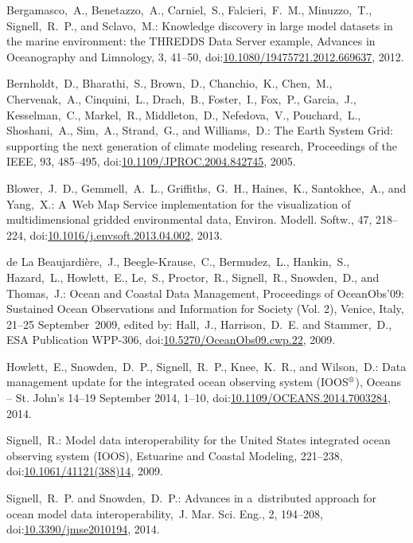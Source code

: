 \documentclass[osd, online, hvmath]{copernicus}
\begin{document}
\begin{thebibliography}{99}

Bergamasco,~A., Benetazzo,~A., Carniel,~S., Falcieri,~F.~M., Minuzzo,~T., Signell,~R.~P., and Sclavo,~M.:
 Knowledge discovery in large model datasets in the marine environment: the THREDDS Data Server example, Advances in Oceanography and Limnology, 3, 41--50,
doi:\href{http://dx.doi.org/10.1080/19475721.2012.669637}{10.1080/19475721.2012.669637}, 2012.


Bernholdt,~D., Bharathi,~S., Brown,~D., Chanchio,~K., Chen,~M.,
Chervenak,~A., Cinquini,~L., Drach,~B., Foster,~I., Fox,~P.,
Garcia,~J., Kesselman,~C., Markel,~R., Middleton,~D., Nefedova,~V.,
Pouchard,~L., Shoshani,~A., Sim,~A., Strand,~G., and Williams,~D.: The Earth System Grid: supporting the next generation of climate modeling research, Proceedings of the IEEE, 93, 485--495,
doi:\href{http://dx.doi.org/10.1109/JPROC.2004.842745}{10.1109/JPROC.2004.842745}, 2005.


Blower,~J.~D., Gemmell,~A.~L., Griffiths,~G.~H., Haines,~K.,
Santokhee,~A., and Yang,~X.: A~Web Map Service implementation for the visualization of multidimensional gridded environmental data, Environ. Modell. Softw., 47, 218--224,
doi:\href{http://dx.doi.org/10.1016/j.envsoft.2013.04.002}{10.1016/j.envsoft.2013.04.002}, 2013.


de La Beaujardi\`{e}re,~J., Beegle-Krause,~C., Bermudez,~L.,
Hankin,~S., Hazard,~L., Howlett,~E., Le,~S., Proctor,~R., Signell,~R.,
Snowden,~D., and Thomas,~J.: Ocean and Coastal Data Management,
Proceedings of OceanObs'09: Sustained Ocean Observations and
Information for Society (Vol. 2), Venice, Italy, 21--25
September~2009, edited by: Hall,~J., Harrison,~D.~E. and Stammer,~D., ESA Publication
WPP-306,
doi:\href{http://dx.doi.org/10.5270/OceanObs09.cwp.22}{10.5270/OceanObs09.cwp.22}, 2009.


Howlett,~E., Snowden,~D.~P., Signell,~R.~P., Knee,~K.~R., and
Wilson,~D.: Data management update for the integrated ocean observing
system (IOOS$^{\text{\textregistered}}$), Oceans -- St. John's 14--19
September 2014, 1--10,
doi:\href{http://dx.doi.org/10.1109/OCEANS.2014.7003284}{10.1109/OCEANS.2014.7003284}, 2014.


Signell,~R.: Model data interoperability for the United States integrated ocean observing system (IOOS), Estuarine and Coastal Modeling, 221--238,
doi:\href{http://dx.doi.org/10.1061/41121(388)14}{10.1061/41121(388)14}, 2009.


Signell,~R.~P. and Snowden,~D.~P.: Advances in a~distributed approach for ocean model data interoperability,~J. Mar. Sci. Eng., 2, 194--208,
doi:\href{http://dx.doi.org/10.3390/jmse2010194}{10.3390/jmse2010194}, 2014.

\end{thebibliography}
\end{document}
